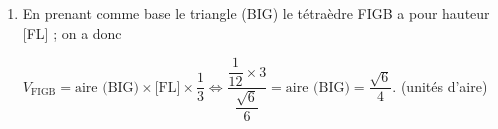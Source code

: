 \documentclass[10pt]{article}
\providecommand{\vect}[1]{\overrightarrow{#1}}
\begin{document}
\begin{enumerate}
\begin{enumerate}
on a FL$^2 = \left\|\vect{\text{FL}}\right\|^2 = \left(-\dfrac13\right)^2 + \left(\dfrac16\right)^2  + \left(- \dfrac16 \right)^2  = \dfrac19 + \dfrac{1}{36} + \dfrac{1}{36} =  \dfrac{4}{36} + \dfrac{2}{36} = \dfrac{6}{36}$,

donc FL $ = \sqrt{\dfrac{6}{36}} = \dfrac{\sqrt{6}}{6}$.
		\item 
En prenant comme base le triangle (BIG) le tétraèdre FIGB a pour hauteur [FL] ; on a donc 
		
$V_{\text{FIGB}} = \text{aire (BIG)} \times \text{[FL]} \times \dfrac13 \iff \dfrac{\dfrac{1}{12} \times 3}{\dfrac{\sqrt{6}}{6}} = \text{aire (BIG)} = \dfrac{\sqrt{6}}{4}$. (unités d'aire)
	\end{enumerate}
\end{enumerate}

\medskip
\end{document}
